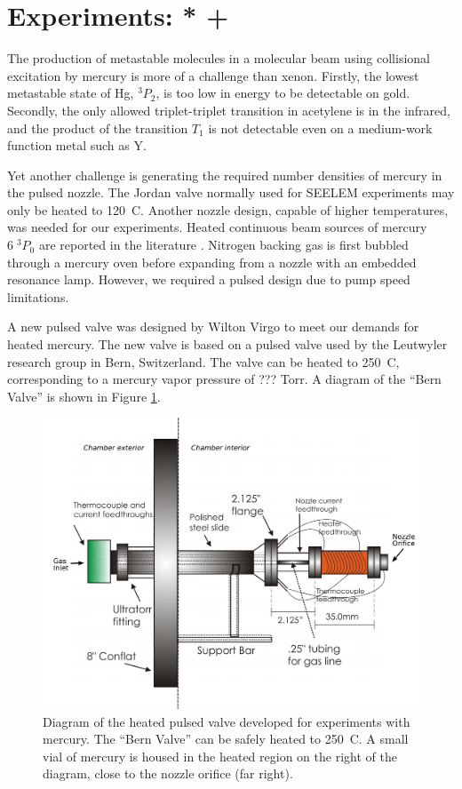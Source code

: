 \documentclass[12pt]{mitthesis}
\begin{document}
\section{Experiments: * + }

The production of metastable molecules in a molecular beam using
collisional excitation by mercury is more of a challenge than xenon.
Firstly, the lowest metastable state of Hg, $^3P_2$, is too low in
energy to be detectable on gold.  Secondly, the only allowed
triplet-triplet transition in acetylene is in the infrared, and the
product of the transition $T_1$ is not detectable even on a
medium-work function metal such as Y.

Yet another challenge is generating the required number densities of
mercury in the pulsed nozzle.  The Jordan valve normally used for
SEELEM experiments may only be heated to 120\degrees\ C.  Another
nozzle design, capable of higher temperatures, was needed for our
experiments.  Heated continuous beam sources of mercury $6 \; ^3P_0$
are reported in the literature \cite{haberman75, obi83}.  Nitrogen
backing gas is first bubbled through a mercury oven before expanding
from a nozzle with an embedded resonance lamp.  However, we required a
pulsed design due to pump speed limitations.  

A new pulsed valve was designed by Wilton Virgo to meet our demands
for heated mercury.  The new valve is based on a pulsed valve used by
the Leutwyler research group in Bern, Switzerland.  The valve can be
heated to 250\degrees\ C, corresponding to a mercury vapor pressure of
??? Torr.  A diagram of the ``Bern Valve'' is shown in Figure
\ref{fig:bern-diagram}.

\begin{figure}
  \caption{Diagram of the heated pulsed valve developed for
    experiments with mercury.  The ``Bern Valve'' can be safely heated
    to 250\degrees\ C.  A small vial of mercury is housed in the
    heated region on the right of the diagram, close to the nozzle
    orifice (far right).}
  \label{fig:bern-diagram}
  \centering
  \includegraphics[width=6in]{bern-diagram.pdf}
\end{figure}
\end{document}
